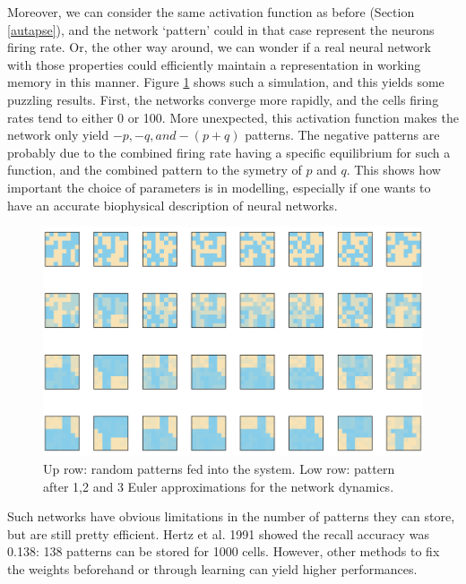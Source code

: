 \documentclass{article}
\begin{document}
Moreover, we can consider the same activation function as before (Section \ref{autapse}), and the network `pattern' could in that case represent the neurons firing rate. Or, the other way around, we can wonder if a real neural network with those properties could efficiently maintain a representation in working memory in this manner. Figure \ref{fig:fig13} shows such a simulation, and this yields some puzzling results. First, the networks converge more rapidly, and the cells firing rates tend to either 0 or 100. More unexpected, this activation function makes the network only yield $-p, -q, and -(p+q)$ patterns. The negative patterns are probably due to the combined firing rate having a specific equilibrium for such a function, and the combined pattern to the symetry of $p$ and $q$. This shows how important the choice of parameters is in modelling, especially if one wants to have an accurate biophysical description of neural networks.

\begin{figure}[H]
\centering
\includegraphics[width=.8\linewidth]{exercice5fig14.png}
\caption[spt]{Up row: random patterns fed into the system. Low row: pattern after 1,2 and 3 Euler approximations for the network dynamics.}\label{fig:fig13}
\end{figure}

Such networks have obvious limitations in the number of patterns they can store, but are still pretty efficient. Hertz et al. 1991 showed the recall accuracy was 0.138: 138 patterns can be stored for 1000 cells. However, other methods to fix the weights beforehand or through learning can yield higher performances.
\end{document}
